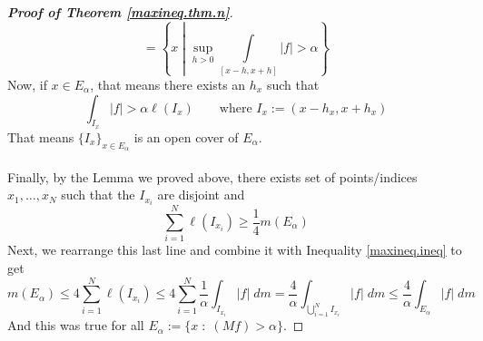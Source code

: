 \documentclass[12pt]{article}
\theoremstyle{plain}
\theoremstyle{definition}
\theoremstyle{remark}
\begin{document}
\begin{proof}[\textbf{Proof of Theorem \hyperlink{maxineq.thm}{\ref*{maxineq.thm.n}}}]
\[    = \left\{x\;\left\lvert\; \sup_{h>0} \int\limits_{[x-h,x+h]} |f|>\alpha\right.\right\}
\]
Now, if $x\in E_\alpha$, that means there exists an $h_x$ such that 
\begin{equation}
    \label{maxineq.ineq}
    \int_{I_x} |f| > \alpha \ell(I_x)
    \qquad \text{where $I_x:=(x-h_x,x+h_x)$}
\end{equation}
That means $\{I_x\}_{x\in E_\alpha}$ is an open cover of $E_\alpha$. 
\\
\\
Finally, by the Lemma we proved above, there exists set of points/indices $x_1,\ldots,x_N$ such that the $I_{x_i}$ are disjoint and
\[
    \sum_{i=1}^N \ell(I_{x_i}) \geq \frac{1}{4} m(E_\alpha)
\]
Next, we rearrange this last line and combine it with Inequality \ref{maxineq.ineq} to get
\[
    m(E_\alpha)\leq
    4\sum_{i=1}^N \ell(I_{x_i}) 
    \leq 
    4\sum_{i=1}^N \frac{1}{\alpha}\int_{I_{x_i}} |f|\; dm
    = \frac{4}{\alpha}\int_{\bigcup^N_{i=1} I_{x_i}} |f|\; dm
    \leq 
    \frac{4}{\alpha}\int_{E_\alpha} |f|\; dm
\]
And this was true for all $E_\alpha:=\{x\;:\;(Mf)>\alpha\}$.

\end{proof}
\end{document}
